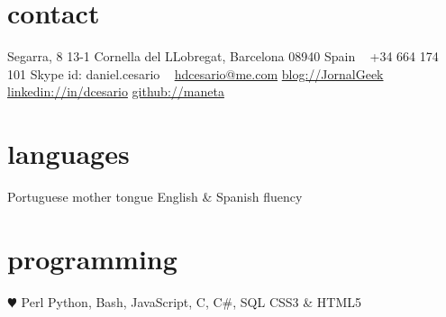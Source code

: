 \documentclass[]{friggeri-cv} %
\begin{document}


\begin{aside} %
\section{contact}
Segarra, 8 13-1
Cornella del LLobregat, Barcelona 08940
Spain
~
+34 664 174 101
Skype id: daniel.cesario
~
\href{mailto:hdcesario@me.com}{hdcesario@me.com}
\href{http://www.jornalgeek.com/author/maneta/}{blog://JornalGeek}
\href{http://es.linkedin.com/in/dcesario/}{linkedin://in/dcesario}
\href{https://github.com/maneta}{github://maneta}
\section{languages}
Portuguese mother tongue
English \& Spanish fluency
\section{programming}
{\color{red} $\varheartsuit$} Perl
Python, Bash, JavaScript, C, C\#, SQL 
CSS3 \& HTML5
\end{aside}



\end{document}
